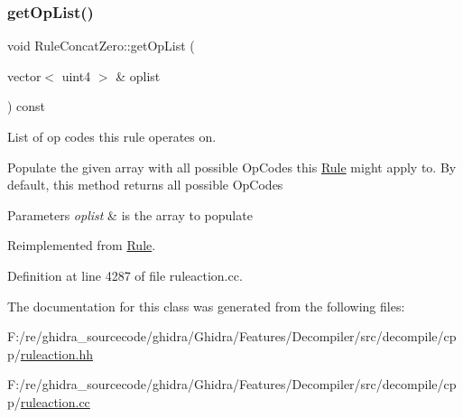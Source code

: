 \subsubsection{\texorpdfstring{getOpList()}{getOpList()}}
{\footnotesize\ttfamily void Rule\+Concat\+Zero\+::get\+Op\+List (\begin{DoxyParamCaption}\item[{vector$<$ uint4 $>$ \&}]{oplist }\end{DoxyParamCaption}) const\hspace{0.3cm}{\ttfamily [virtual]}}



List of op codes this rule operates on. 

Populate the given array with all possible Op\+Codes this \mbox{\hyperlink{class_rule}{Rule}} might apply to. By default, this method returns all possible Op\+Codes 
\begin{DoxyParams}{Parameters}
{\em oplist} & is the array to populate \\
\hline
\end{DoxyParams}


Reimplemented from \mbox{\hyperlink{class_rule_a4023bfc7825de0ab866790551856d10e}{Rule}}.



Definition at line 4287 of file ruleaction.\+cc.



The documentation for this class was generated from the following files\+:\begin{DoxyCompactItemize}
\item 
F\+:/re/ghidra\+\_\+sourcecode/ghidra/\+Ghidra/\+Features/\+Decompiler/src/decompile/cpp/\mbox{\hyperlink{ruleaction_8hh}{ruleaction.\+hh}}\item 
F\+:/re/ghidra\+\_\+sourcecode/ghidra/\+Ghidra/\+Features/\+Decompiler/src/decompile/cpp/\mbox{\hyperlink{ruleaction_8cc}{ruleaction.\+cc}}\end{DoxyCompactItemize}
